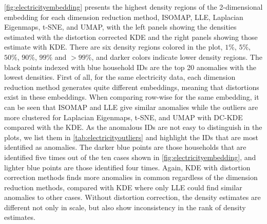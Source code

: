 \documentclass[12pt]{article}
\begin{document}
\autoref{fig:electricityembedding} presents the highest density regions of the 2-dimensional embedding for each dimension reduction method, ISOMAP, LLE, Laplacian Eigenmaps, t-SNE, and UMAP, with the left panels showing the densities estimated with the distortion corrected KDE and the right panels showing those estimate with KDE. There are six density regions colored in the plot, \(1\%\), \(5\%\), \(50\%\), \(90\%\), \(99\%\) and \(>99\%\), and darker colors indicate lower density regions. The black points indexed with blue household IDs are the top 20 anomalies with the lowest densities. First of all, for the same electricity data, each dimension reduction method generates quite different embeddings, meaning that distortions exist in these embeddings. When comparing row-wise for the same embedding, it can be seen that ISOMAP and LLE give similar anomalies while the outliers are more clustered for Laplacian Eigenmaps, t-SNE, and UMAP with DC-KDE compared with the KDE. As the anomalous IDs are not easy to distinguish in the plots, we list them in \autoref{tab:electricityoutliers} and highlight the IDs that are most identified as anomalies. The darker blue points are those households that are identified five times out of the ten cases shown in \autoref{fig:electricityembedding}, and lighter blue points are those identified four times. Again, KDE with distortion correction methods finds more anomalies in common regardless of the dimension reduction methods, compared with KDE where only LLE could find similar anomalies to other cases. Without distortion correction, the density estimates are different not only in scale, but also show inconsistency in the rank of density estimates.
\end{document}
